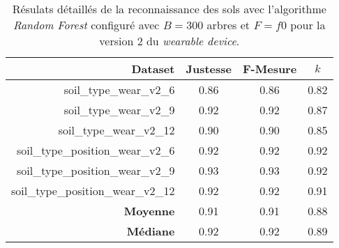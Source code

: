 \begin{table}[H]\renewcommand{\arraystretch}{0.5}
	\centering
	\caption{Résulats détaillés de la reconnaissance des sols avec l'algorithme \textit{Random Forest} configuré avec $B=300$ arbres et $F=f0$ pour la version 2 du \textit{wearable device}.}
	\label{tab:tab:rf-300-f0-wear-v2}
	\begin{tabular}{@{}rccc@{}}
		\toprule
			\textbf{Dataset} & \textbf{Justesse} & \textbf{F-Mesure} & \textbf{$k$} \\
		\midrule
			soil\_type\_wear\_v2\_6 & 0.86 & 0.86 & 0.82 \\
			soil\_type\_wear\_v2\_9 & 0.92 & 0.92 & 0.87 \\
			soil\_type\_wear\_v2\_12 & 0.90 & 0.90 & 0.85 \\
			soil\_type\_position\_wear\_v2\_6 & 0.92 & 0.92 & 0.92 \\
			soil\_type\_position\_wear\_v2\_9 & 0.93 & 0.93 & 0.92 \\
			soil\_type\_position\_wear\_v2\_12 & 0.92 & 0.92 & 0.91 \\
			\textbf{Moyenne} & 0.91 & 0.91 & 0.88 \\
			\textbf{Médiane} & 0.92 & 0.92 & 0.89 \\
		\bottomrule
	\end{tabular}
\end{table}

